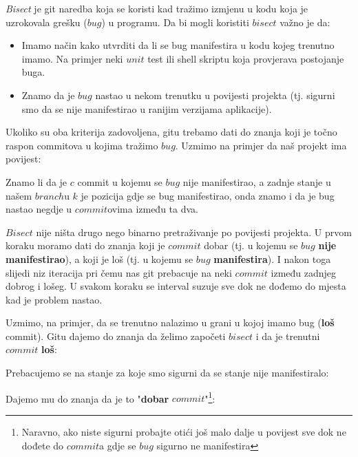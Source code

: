 
\emph{Bisect} je git naredba koja se koristi kad tražimo izmjenu u kodu koja je uzrokovala grešku ($bug$) u programu.
Da bi mogli koristiti $bisect$ važno je da:

\begin{itemize}
    \item Imamo način kako utvrditi da li se bug manifestira u kodu kojeg trenutno imamo. Na primjer neki $unit$ test ili shell skriptu koja provjerava postojanje buga.
    \item Znamo da je $bug$ nastao u nekom trenutku u povijesti projekta (tj. sigurni smo da se nije manifestirao u ranijim verzijama aplikacije).
\end{itemize}

Ukoliko su oba kriterija zadovoljena, gitu trebamo dati do znanja koji je točno raspon commitova u kojima tražimo $bug$.
Uzmimo na primjer da naš projekt ima povijest:



Znamo li da je $c$ commit u kojemu se $bug$ nije manifestirao, a zadnje stanje u našem $branch$u $k$ je pozicija gdje se bug manifestirao, onda znamo i da je bug nastao negdje u $commit$ovima između ta dva.

$Bisect$ nije ništa drugo nego binarno pretraživanje po povijesti projekta. 
U prvom koraku moramo dati do znanja koji je $commit$ dobar (tj. u kojemu se $bug$ \textbf{nije manifestirao}), a koji je loš (tj. u kojemu se $bug$ \textbf{manifestira}).
I nakon toga slijedi niz iteracija pri čemu nas git prebacuje na neki $commit$ između zadnjeg dobrog i lošeg.
U svakom koraku se interval suzuje sve dok ne dođemo do mjesta kad je problem nastao.

Uzmimo, na primjer, da se trenutno nalazimo u grani u kojoj imamo bug (\textbf{loš} commit).
Gitu dajemo do znanja da želimo započeti $bisect$ i da je trenutni $commit$ \textbf{loš}:



Prebacujemo se na stanje za koje smo sigurni da se stanje nije manifestiralo:



Dajemo mu do znanja da je to "\textbf{dobar} $commit$"\footnote{Naravno, ako niste sigurni probajte otići još malo dalje u povijest sve dok ne dođete do $commit$a gdje se $bug$ sigurno ne manifestira}:



